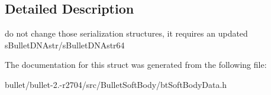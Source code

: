 \subsection{Detailed Description}
do not change those serialization structures, it requires an updated s\+Bullet\+D\+N\+Astr/s\+Bullet\+D\+N\+Astr64 

The documentation for this struct was generated from the following file\+:\begin{DoxyCompactItemize}
\item 
bullet/bullet-\/2.-\/r2704/src/\+Bullet\+Soft\+Body/bt\+Soft\+Body\+Data.\+h\end{DoxyCompactItemize}
